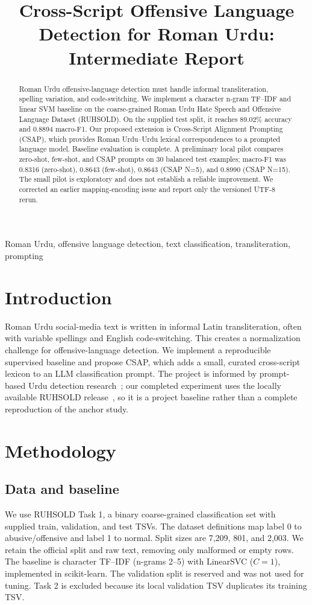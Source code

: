 \documentclass[conference]{IEEEtran}
\title{Cross-Script Offensive Language Detection for Roman Urdu: Intermediate Report}
\author{\IEEEauthorblockN{Group 18: Muhammad Shahbaz Aziz Khan (27100049), Mehreen Iqbal (27100044),\\Syed Ramiz Abbas (27100440), Tahyat Saeed (28100112)}\IEEEauthorblockA{CS 5316: NLP Theory and Applications}}
\begin{document}
\maketitle
\begin{abstract}
Roman Urdu offensive-language detection must handle informal transliteration, spelling variation, and code-switching. We implement a character n-gram TF--IDF and linear SVM baseline on the coarse-grained Roman Urdu Hate Speech and Offensive Language Dataset (RUHSOLD). On the supplied test split, it reaches 89.02\% accuracy and 0.8894 macro-F1. Our proposed extension is Cross-Script Alignment Prompting (CSAP), which provides Roman Urdu--Urdu lexical correspondences to a prompted language model. Baseline evaluation is complete. A preliminary local pilot compares zero-shot, few-shot, and CSAP prompts on 30 balanced test examples; macro-F1 was 0.8316 (zero-shot), 0.8643 (few-shot), 0.8643 (CSAP N=5), and 0.8990 (CSAP N=15). The small pilot is exploratory and does not establish a reliable improvement. We corrected an earlier mapping-encoding issue and report only the versioned UTF-8 rerun.
\end{abstract}
\begin{IEEEkeywords}Roman Urdu, offensive language detection, text classification, transliteration, prompting\end{IEEEkeywords}
\section{Introduction}
Roman Urdu social-media text is written in informal Latin transliteration, often with variable spellings and English code-switching. This creates a normalization challenge for offensive-language detection. We implement a reproducible supervised baseline and propose CSAP, which adds a small, curated cross-script lexicon to an LLM classification prompt. The project is informed by prompt-based Urdu detection research~\cite{maab2026}; our completed experiment uses the locally available RUHSOLD release~\cite{rizwan2020}, so it is a project baseline rather than a complete reproduction of the anchor study.
\section{Methodology}
\subsection{Data and baseline}
We use RUHSOLD Task 1, a binary coarse-grained classification set with supplied train, validation, and test TSVs. The dataset definitions map label 0 to abusive/offensive and label 1 to normal. Split sizes are 7,209, 801, and 2,003. We retain the official split and raw text, removing only malformed or empty rows. The baseline is character TF--IDF (n-grams 2--5) with LinearSVC ($C=1$), implemented in scikit-learn. The validation split is reserved and was not used for tuning. Task 2 is excluded because its local validation TSV duplicates its training TSV.
\end{document}
